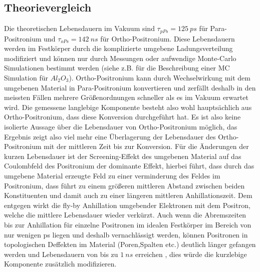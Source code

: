 \documentclass[a4paper,12pt]{article}
\begin{document}
\subsection{Theorievergleich}
Die theoretischen Lebensdauern im Vakuum sind $\tau_{pPs} = \SI{125}{ps}$ für Para-Positronium und $\tau_{oPs} = \SI{142}{ns}$ für Ortho-Positronium. Diese Lebensdauern werden
im Festkörper durch die komplizierte umgebene Ladungsverteilung modifiziert und können nur durch Messungen oder aufwendige Monte-Carlo Simulationen bestimmt werden 
(siehe z.B. \cite{phd_trezzi} für die Beschreibung einer MC Simulation für $Al_{2}O_{3}$). Ortho-Positronium kann durch Wechselwirkung mit dem umgebenen Material in Para-Positronium konvertieren
und zerfällt deshalb in den meissten Fällen mehrere Größenordnungen schneller als es im Vakuum erwartet wird. Die gemessene langlebige Komponente besteht also wohl hauptsächlich aus
Ortho-Positronium, dass diese Konversion durchgeführt hat. Es ist also keine isolierte Aussage über die Lebensdauer von Ortho-Positronium möglich, das Ergebnis zeigt also viel mehr eine 
Überlagerung der Lebensdauer des Ortho-Positronium mit der mittleren Zeit bis zur Konversion. Für die Änderungen der kurzen Lebensdauer ist der Screening-Effekt des umgebenen Material auf 
das Coulombfeld des Positronium der dominante Effekt, hierbei führt, dass durch das umgebene Material erzeugte Feld zu einer verminderung des Feldes im Positronium, dass führt zu einem 
größeren mittleren Abstand zwischen beiden Konstituenten und damit auch zu einer längeren mittleren Anhillationszeit. Dem entgegen wirkt die fly-by Anhillation umgebender Elektronen mit
dem Positron, welche die mittlere Lebensdauer wieder verkürzt. Auch wenn die Abremszeiten bis zur Anhillation für einzelne Positronen im idealen Festkörper im Bereich von nur wenigen 
ps liegen und deshalb vernachlässigt werden, können Positronen in topologischen Deffekten im Material (Poren,Spalten etc.) deutlich länger gefangen werden und Lebensdauern von bis zu $ \SI{1}{ns}$
erreichen \cite{theory2}, dies würde die kurzlebige Komponente zusätzlich modifizieren.



{}
\end{document}
